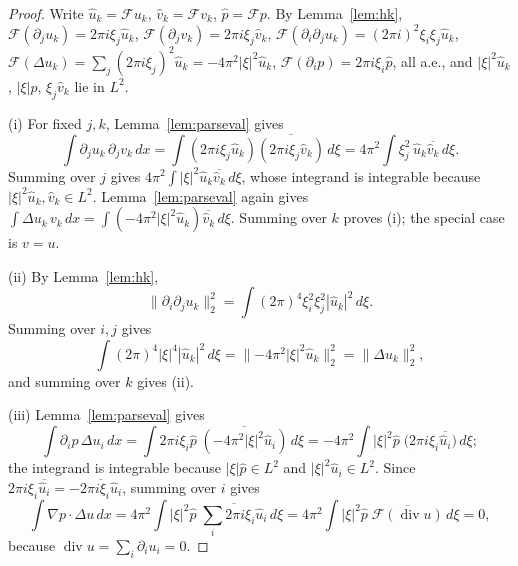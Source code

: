\documentclass[11pt]{article}
\theoremstyle{definition}
\theoremstyle{plain}
\begin{document}
\begin{proof}
Write $\hat u_k=\mathcal Fu_k$, $\hat v_k=\mathcal Fv_k$, $\hat p=\mathcal Fp$.
By Lemma~\ref{lem:hk}, $\mathcal F(\partial_ju_k)=2\pi i\xi_j\hat u_k$,
$\mathcal F(\partial_jv_k)=2\pi i\xi_j\hat v_k$,
$\mathcal F(\partial_i\partial_ju_k)=(2\pi i)^2\xi_i\xi_j\hat u_k$,
$\mathcal F(\Delta u_k)=\sum_j(2\pi i\xi_j)^2\hat u_k=-4\pi^2|\xi|^2\hat u_k$,
$\mathcal F(\partial_ip)=2\pi i\xi_i\hat p$, all a.e., and
$|\xi|^2\hat u_k$, $|\xi|\hat p$, $\xi_j\hat v_k$ lie in $L^2$.

(i) For fixed $j,k$, Lemma~\ref{lem:parseval} gives
\[
 \int\partial_ju_k\,\partial_jv_k\,dx
 =\int(2\pi i\xi_j\hat u_k)\overline{(2\pi i\xi_j\hat v_k)}\,d\xi
 =4\pi^2\int\xi_j^2\,\hat u_k\overline{\hat v_k}\,d\xi.
\]
Summing over $j$ gives $4\pi^2\int|\xi|^2\hat u_k\overline{\hat v_k}\,d\xi$,
whose integrand is integrable because $|\xi|^2\hat u_k,\hat v_k\in L^2$.
Lemma~\ref{lem:parseval} again gives
$\int\Delta u_k\,v_k\,dx=\int(-4\pi^2|\xi|^2\hat u_k)\overline{\hat v_k}\,d\xi$.
Summing over $k$ proves (i); the special case is $v=u$.

(ii) By Lemma~\ref{lem:hk},
\[
 \|\partial_i\partial_ju_k\|_2^2
 =\int(2\pi)^4\xi_i^2\xi_j^2|\hat u_k|^2\,d\xi.
\]
Summing over $i,j$ gives
\[
 \int(2\pi)^4|\xi|^4|\hat u_k|^2\,d\xi
 =\|{-4\pi^2}|\xi|^2\hat u_k\|_2^2=\|\Delta u_k\|_2^2,
\]
and summing over $k$ gives (ii).

(iii) Lemma~\ref{lem:parseval} gives
\[
 \int\partial_ip\,\Delta u_i\,dx
 =\int2\pi i\xi_i\hat p\;\overline{(-4\pi^2|\xi|^2\hat u_i)}\,d\xi
 =-4\pi^2\int|\xi|^2\hat p\;\bigl(2\pi i\xi_i\overline{\hat u_i}\bigr)\,d\xi;
\]
the integrand is integrable because $|\xi|\hat p\in L^2$ and
$|\xi|^2\hat u_i\in L^2$.  Since $2\pi i\xi_i\overline{\hat u_i}
=-\overline{2\pi i\xi_i\hat u_i}$, summing over $i$ gives
\[
 \int\nabla p\cdot\Delta u\,dx
 =4\pi^2\int|\xi|^2\hat p\;\overline{\sum_i2\pi i\xi_i\hat u_i}\,d\xi
 =4\pi^2\int|\xi|^2\hat p\;\overline{\mathcal F(\operatorname{div}u)}\,d\xi=0,
\]
because $\operatorname{div}u=\sum_i\partial_iu_i=0$.
\end{proof}
\end{document}
